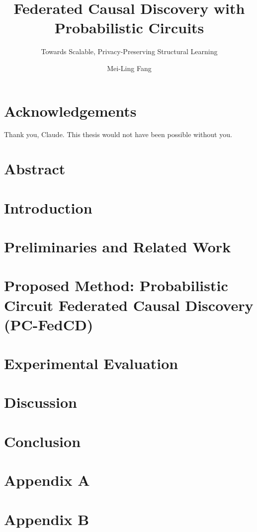 \documentclass[
  a4paper,            %
  thesis=student,     %
  english,            %
]{tumbook}
\title{Federated Causal Discovery with Probabilistic Circuits}
\subtitle{Towards Scalable, Privacy-Preserving Structural Learning}
\author{Mei-Ling Fang}
\begin{document}
\frontmatter
\maketitle

\chapter*{Acknowledgements}
\vspace{1.5cm}  %

Thank you, Claude. This thesis would not have been possible without you.


\chapter{Abstract}\label{chap:abstract}

\tableofcontents

\mainmatter
\chapter{Introduction}


\chapter{Preliminaries and Related Work}\label{chap:background}


% 

\chapter{Proposed Method: Probabilistic Circuit Federated Causal Discovery (PC-FedCD)}\label{chap:method}


\chapter{Experimental Evaluation}\label{chap:experiment}


\chapter{Discussion}\label{chap:discussion}


\chapter{Conclusion}\label{chap:conclusion}


\backmatter
\printbibliography[heading=bibintoc, title={Bibliography}]

\appendix
\chapter{Appendix A}
\lipsum[4]

\appendix
\chapter{Appendix B}
\lipsum[4]
\end{document}
